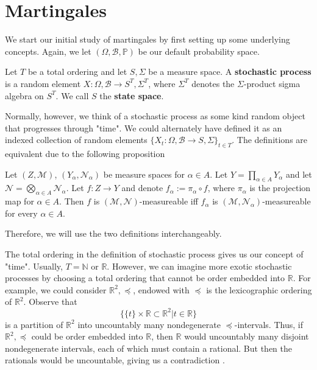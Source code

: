 \section{Martingales}
\label{stoch:martingales}

We start our initial study of martingales by first setting up some underlying concepts. Again, we let \((\Omega, \mathcal{B}, \mathbb{P})\) be our default probability space.

\begin{definition}
    Let \(T\) be a total ordering and let \(S, \Sigma\) be a measure space. A \textbf{stochastic process} is a random element \(X: \Omega, \mathcal{B} \to S^{T}, \Sigma^{T}\), where \(\Sigma^{T}\) denotes the \(\Sigma\)-product sigma algebra on \(S^{T}\). We call \(S\) the \textbf{state space}.
\end{definition}

Normally, however, we think of a stochastic process as some kind random object that progresses through "time". We could alternately have defined it as an indexed collection of random elements \(\{X_{t}: \Omega, \mathcal{B} \to S, \Sigma\}_{t \in T}\). The definitions are equivalent due to the following proposition

\begin{proposition}
    Let \((Z, \mathcal{M})\), $(Y_{\alpha}, \mathcal{N}_\alpha)$ be measure spaces for $\alpha \in A$. Let $Y = \prod\limits_{\alpha \in A} Y_\alpha$ and let $\mathcal{N} = \bigotimes\limits_{\alpha \in A} \mathcal{N}_\alpha$. Let $f : Z \to Y$ and denote $f_{\alpha} := \pi_{\alpha} \circ f$, where $\pi_\alpha$ is the projection map for $\alpha \in A$. Then $f$ is $(\mathcal{M}, \mathcal{N})$-measureable iff $f_\alpha$ is $(\mathcal{M}, \mathcal{N}_\alpha)$-measureable for every $\alpha \in A$.
\end{proposition}

Therefore, we will use the two definitions interchangeably.

The total ordering in the definition of stochastic process gives us our concept of "time". Usually, \(T = \mathbb{N}\) or \(\mathbb{R}\). However, we can imagine more exotic stochastic processes by choosing a total ordering that cannot be order embedded into \(\mathbb{R}\). For example, we could consider \(\mathbb{R}^{2}, \preccurlyeq\), endowed with \(\preccurlyeq\) is the lexicographic ordering of \(\mathbb{R}^{2}\). Observe that 
\[\{\{t\} \times \mathbb{R} \subset \mathbb{R}^{2} | t \in \mathbb{R}\}\]
is a partition of \(\mathbb{R}^{2}\) into uncountably many nondegenerate \(\preccurlyeq\)-intervals. Thus, if \(\mathbb{R}^{2}, \preccurlyeq\) could be order embedded into \(\mathbb{R}\), then \(\mathbb{R}\) would uncountably many disjoint nondegenerate intervals, each of which must contain a rational. But then the rationals would be uncountable, giving us a contradiction \cite{exotic_order}.


